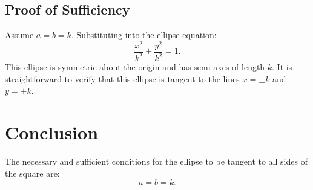 \documentclass[12pt]{article}
\begin{document}
\subsection*{Proof of Sufficiency}
Assume $a = b = k$. Substituting into the ellipse equation:
\[
\frac{x^2}{k^2} + \frac{y^2}{k^2} = 1.
\]
This ellipse is symmetric about the origin and has semi-axes of length $k$. It is straightforward to verify that this ellipse is tangent to the lines $x = \pm k$ and $y = \pm k$.

\section*{Conclusion}
The necessary and sufficient conditions for the ellipse to be tangent to all sides of the square are:
\[
a = b = k.
\]
\end{document}
